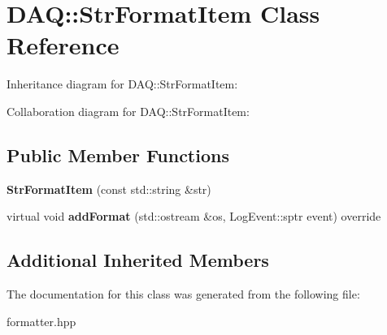 \hypertarget{classDAQ_1_1StrFormatItem}{}\section{D\+AQ\+:\+:Str\+Format\+Item Class Reference}
\label{classDAQ_1_1StrFormatItem}


Inheritance diagram for D\+AQ\+:\+:Str\+Format\+Item\+:


Collaboration diagram for D\+AQ\+:\+:Str\+Format\+Item\+:
\subsection*{Public Member Functions}
\begin{DoxyCompactItemize}
\item 
\mbox{\label{classDAQ_1_1StrFormatItem_aa0b523db71c62e3c3046e62574f97465}} 
{\bfseries Str\+Format\+Item} (const std\+::string \&str)
\item 
\mbox{\label{classDAQ_1_1StrFormatItem_ac21bf7ef660a2cb0415c231799e6dddf}} 
virtual void {\bfseries add\+Format} (std\+::ostream \&os, Log\+Event\+::sptr event) override
\end{DoxyCompactItemize}
\subsection*{Additional Inherited Members}


The documentation for this class was generated from the following file\+:\begin{DoxyCompactItemize}
\item 
formatter.\+hpp\end{DoxyCompactItemize}
